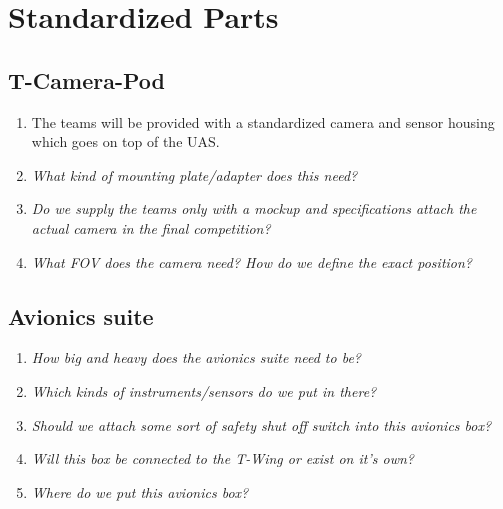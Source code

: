 \documentclass{article}
\begin{document}
\section{Standardized Parts}

\subsection{T-Camera-Pod}
\begin{enumerate}
  \item The teams will be provided with a standardized camera and sensor housing which goes on top of the UAS.
  \item \emph{What kind of mounting plate/adapter does this need?}
  \item \emph{Do we supply the teams only with a mockup and specifications attach the actual camera in the final competition?}
  \item \emph{What FOV does the camera need? How do we define the exact position?}
\end{enumerate}



\subsection{Avionics suite}
\begin{enumerate}
  \item \emph{How big and heavy does the avionics suite need to be?}
  \item \emph{Which kinds of instruments/sensors do we put in there?}
  \item \emph{Should we attach some sort of safety shut off switch into this avionics box?}
  \item \emph{Will this box be connected to the T-Wing or exist on it's own?}
  \item \emph{Where do we put this avionics box?}
\end{enumerate}
\end{document}
